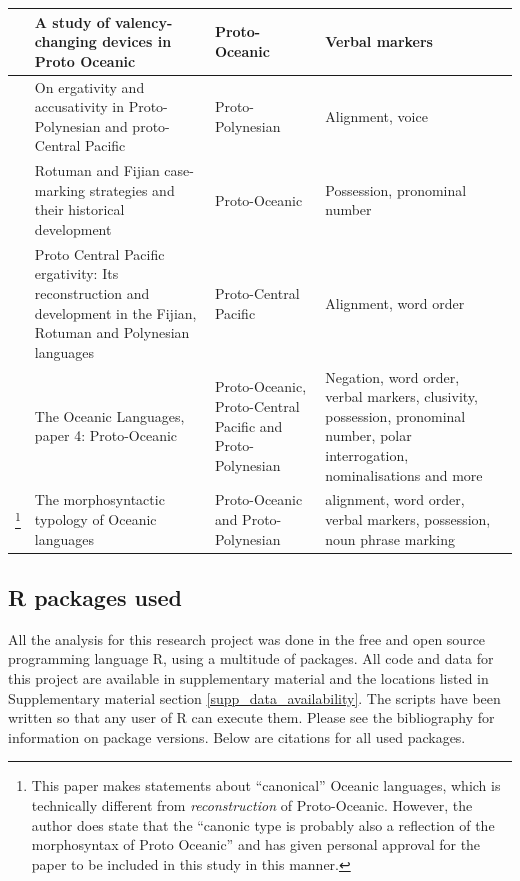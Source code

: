 \documentclass[12pt,letterpaper]{article}
\begin{document}
\begin{longtable}{|p{3cm}|  p{5cm}| p{4cm} | p{3cm}  | p{3cm} |}
\citet{evans2003study} & A study of valency-changing devices in Proto Oceanic & Proto-Oceanic & Verbal markers \\ \hline

\citet{ball2007ergativity} & On ergativity and accusativity in Proto-Polynesian and proto-Central Pacific&Proto-Polynesian & Alignment, voice \\ \hline

\citet{kikusawa2001rotuman} & Rotuman and Fijian case-marking strategies and their historical development  & Proto-Oceanic & Possession, pronominal number \\ \hline

\citet{kikusawa2002proto}  & Proto Central Pacific ergativity: Its reconstruction and development in the Fijian, Rotuman and Polynesian languages & Proto-Central Pacific   & Alignment, word order \\ \hline

\citet{lynchrosscrowley_proto_grammar_oceanic} & The Oceanic Languages, paper 4: Proto-Oceanic & Proto-Oceanic, Proto-Central Pacific and Proto-Polynesian & Negation, word order, verbal markers, clusivity, possession, pronominal number, polar interrogation, nominalisations and more \\ \hline

\citet{ross2004morphosyntactic}\footnote{This paper makes statements about ``canonical'' Oceanic languages, which is technically different from \emph{reconstruction} of Proto-Oceanic. However, the author does state that the ``canonic type is probably also a reflection of the morphosyntax of Proto Oceanic'' \citep[492]{ross2004morphosyntactic} and has given personal approval for the paper to be included in this study in this manner.}  & The morphosyntactic typology of Oceanic languages &  Proto-Oceanic and Proto-Polynesian  & alignment, word order, verbal markers, possession, noun phrase marking \\ \hline
\end{longtable}
\FloatBarrier


\subsection{R packages used}
\label{supp:r_packages}
All the analysis for this research project was done in the free and open source programming language R, using a multitude of packages. All code and data for this project are available in supplementary material and the locations listed in Supplementary material section \ref{supp_data_availability}. The scripts have been written so that any user of R can execute them. Please see the bibliography for information on package versions. Below are citations for all used packages.
\end{document}
